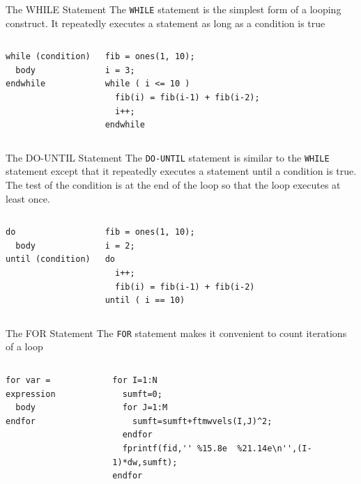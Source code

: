 \documentclass[slidestop,mathserif,compress,xcolor=svgnames]{beamer}
\newenvironment{eblock}[0]
{
\begin{beamerboxesrounded}[upper=uppercol2,lower=lowercol2,shadow=true]}
{\end{beamerboxesrounded}}
\begin{document}
\begin{frame}
  \begin{eblock}{The WHILE Statement}
    The \texttt{WHILE} statement is the simplest form of a looping construct. It repeatedly executes a statement as long as a condition is true
    {\tiny
      \begin{columns}
        \column{4cm}
        \begin{verbatim}
while (condition)
  body
endwhile
        \end{verbatim}
        \column{6cm}
        \begin{verbatim}
fib = ones(1, 10);
i = 3;
while ( i <= 10 )
  fib(i) = fib(i-1) + fib(i-2); 
  i++;
endwhile
        \end{verbatim}
      \end{columns}
    }
  \end{eblock}

  \begin{eblock}{The DO-UNTIL Statement}
    The \texttt{DO-UNTIL} statement is similar to the \texttt{WHILE} statement except that it repeatedly executes a statement until a condition is true. The test of the condition is at the end of the loop so that the loop executes at least once.
    {\tiny
      \begin{columns}
        \column{4cm}
        \begin{verbatim}
do
  body
until (condition)
        \end{verbatim}
        \column{6cm}
        \begin{verbatim}
fib = ones(1, 10);
i = 2;
do
  i++;
  fib(i) = fib(i-1) + fib(i-2) 
until ( i == 10)
        \end{verbatim}
      \end{columns}
    }
  \end{eblock}

  \begin{eblock}{The FOR Statement}
    The \texttt{FOR} statement makes it convenient to count iterations of a loop
    {\tiny
      \begin{columns}
        \column{3cm}
        \begin{verbatim}
for var = expression
  body
endfor
        \end{verbatim}
        \column{7cm}
        \begin{verbatim}
for I=1:N
  sumft=0;
  for J=1:M
    sumft=sumft+ftmwvels(I,J)^2;
  endfor
  fprintf(fid,'' %15.8e  %21.14e\n'',(I-1)*dw,sumft);
endfor
        \end{verbatim}
      \end{columns}
    }
  \end{eblock}


\end{frame}
\end{document}
